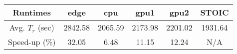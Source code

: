 \scriptsize

\begin{tabular}{|c|c|c|c|c|c|} 
\hline
\textbf{Runtimes}& \textbf{edge} & \textbf{cpu} & \textbf{gpu1} & \textbf{gpu2} & \textbf{STOIC} \\
\hline
Avg. $T_r$ (sec) & 2842.58 & 2065.59 & 2173.98 & 2201.02 & 1931.64 \\
\hline
Speed-up (\%) & 32.05 & 6.48 & 11.15 & 12.24 & N/A \\
\hline
\end{tabular}

